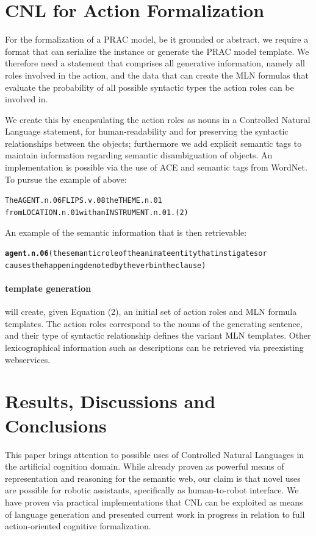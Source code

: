 \documentclass[oribibl]{llncs}
\begin{document}
\section{CNL for Action Formalization}
For the formalization of a PRAC model, be it grounded or abstract, we 
require a format that can serialize the instance or generate the PRAC 
model template.
We therefore need a statement that comprises all generative information,
 namely all roles involved in the action, and the data that can create 
 the MLN formulas that evaluate the probability of all possible syntactic 
types the action roles can be involved in.

We create this by encapsulating the action roles as nouns in a Controlled 
Natural Language statement, for human-readability and for preserving the 
syntactic relationships between the objects; furthermore we add explicit 
semantic tags to maintain information regarding semantic disambiguation
 of objects.
An implementation is possible via the use of ACE and semantic tags from 
WordNet\cite{Miller95wordnet:a}. To pursue the example of above:
\begin{alltt}
The AGENT.n.06 FLIPS.v.08 the THEME.n.01 
from LOCATION.n.01 with an INSTRUMENT.n.01. \hfill {\normalfont (2)}
\end{alltt}
An example of the semantic information that is then retrievable:
{\small
\begin{alltt}
\textbf{agent.n.06} {\color{red}(the semantic role of the animate entity that instigates or 
causes the happening denoted by the verb in the clause)}
\end{alltt}}

\paragraph{template generation} will create, given Equation (2), 
an initial set of action roles and MLN formula templates.  
The action roles correspond to the nouns of the generating sentence, 
and their type of syntactic relationship defines the variant MLN 
templates. Other lexicographical 
information such as descriptions can be retrieved via preexisting 
webservices.

\section{Results, Discussions and Conclusions}
This paper brings attention to possible uses of Controlled Natural 
Languages in the artificial cognition domain. While already proven 
as powerful means of representation and reasoning for the semantic 
web\cite{kaljurand:phd}, our claim is that novel uses are possible 
for robotic assistants, specifically as human-to-robot interface.
We have proven via practical implementations that CNL can be exploited
 as means of language generation and presented current work in progress
  in relation to full action-oriented cognitive formalization.
\end{document}
